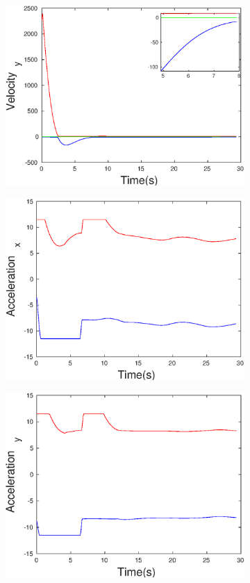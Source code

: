 \begin{figure}[h]
\begin{subfigure}{.5\linewidth}
\end{subfigure}
\begin{subfigure}{.5\linewidth}
\centering
\includegraphics[width=.9\linewidth]{figures/Prad/s3pmpradVelocity_y}
\end{subfigure}
\begin{subfigure}{.5\linewidth}
\centering
\includegraphics[width=.9\linewidth]{figures/Prad/s3pmpradAcceleration_x}
\end{subfigure}
\begin{subfigure}{.5\linewidth}
\centering
\includegraphics[width=.9\linewidth]{figures/Prad/s3pmpradAcceleration_y}

\end{subfigure}
\end{figure}
